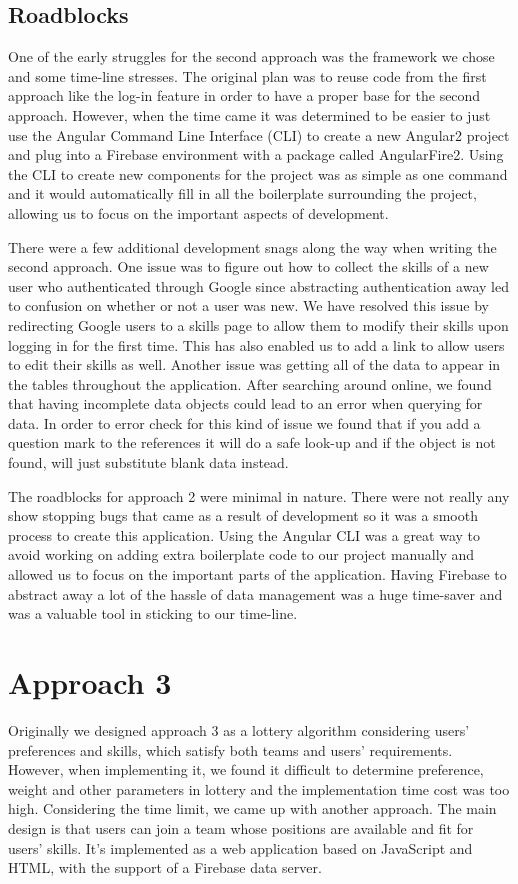 \documentclass[conference]{IEEEtran}
\begin{document}
\subsection{Roadblocks}

One of the early struggles for the second approach was the framework we chose and some time-line stresses. The original plan was to reuse code from the first approach like the log-in feature in order to have a proper base for the second approach. However, when the time came it was determined to be easier to just use the Angular Command Line Interface (CLI) to create a new Angular2 project and plug into a Firebase environment with a package called AngularFire2. Using the CLI to create new components for the project was as simple as one command and it would automatically fill in all the boilerplate surrounding the project, allowing us to focus on the important aspects of development. 

There were a few additional development snags along the way when writing the second approach. One issue was to figure out how to collect the skills of a new user who authenticated through Google since abstracting authentication away led to confusion on whether or not a user was new. We have resolved this issue by redirecting Google users to a skills page to allow them to modify their skills upon logging in for the first time. This has also enabled us to add a link to allow users to edit their skills as well. Another issue was getting all of the data to appear in the tables throughout the application. After searching around online, we found that having incomplete data objects could lead to an error when querying for data. In order to error check for this kind of issue we found that if you add a question mark to the references it will do a safe look-up and if the object is not found, will just substitute blank data instead. 

The roadblocks for approach 2 were minimal in nature. There were not really any show stopping bugs that came as a result of development so it was a smooth process to create this application. Using the Angular CLI was a great way to avoid working on adding extra boilerplate code to our project manually and allowed us to focus on the important parts of the application. Having Firebase to abstract away a lot of the hassle of data management was a huge time-saver and was a valuable tool in sticking to our time-line. 

\section{Approach 3}
Originally we designed approach 3 as a lottery algorithm considering users' preferences and skills, which satisfy both teams and users' requirements. However, when implementing it, we found it difficult to determine preference, weight and other parameters in lottery and the implementation time cost was too high. Considering the time limit, we came up with another approach. The main design is that users can join a team whose positions are available and fit for users' skills. It's implemented as a web application based on JavaScript and HTML, with the support of a Firebase data server.
\end{document}
